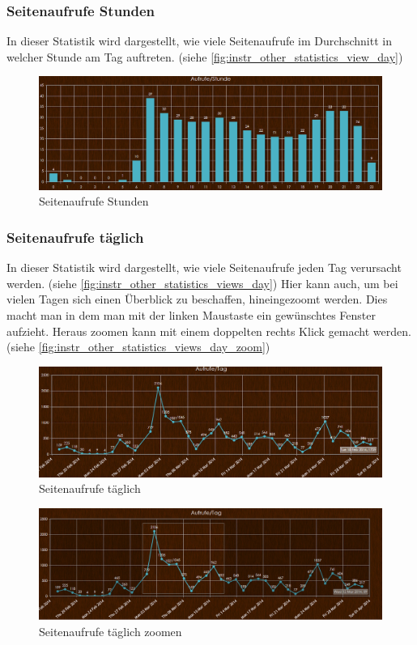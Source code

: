 \subsubsection{Seitenaufrufe Stunden}
In dieser Statistik wird dargestellt, wie viele Seitenaufrufe im Durchschnitt in welcher Stunde am Tag auftreten. (siehe \autoref{fig:instr_other_statistics_view_day})
\begin{figure}[H]
\centering
\includegraphics[keepaspectratio=true, width=17cm]{images/screenshots/statistics_views_hour.png}
\caption{Seitenaufrufe Stunden}
\label{fig:instr_other_statistics_view_day}
\end{figure}
\subsubsection{Seitenaufrufe täglich}
In dieser Statistik wird dargestellt, wie viele Seitenaufrufe jeden Tag verursacht werden. (siehe \autoref{fig:instr_other_statistics_views_day}) Hier kann auch, um bei vielen Tagen sich einen Überblick zu beschaffen, hineingezoomt werden. Dies macht man in dem man mit der linken Maustaste ein gewünschtes Fenster aufzieht. Heraus zoomen kann mit einem doppelten rechts Klick gemacht werden. (siehe \autoref{fig:instr_other_statistics_views_day_zoom})
\begin{figure}[H]
\centering
\includegraphics[keepaspectratio=true, width=17cm]{images/screenshots/statistics_views_day.png}
\caption{Seitenaufrufe täglich}
\label{fig:instr_other_statistics_views_day}
\end{figure}
\begin{figure}[H]
\centering
\includegraphics[keepaspectratio=true, width=17cm]{images/screenshots/statistics_views_day_zoom.png}
\caption{Seitenaufrufe täglich zoomen}
\label{fig:instr_other_statistics_views_day_zoom}
\end{figure}

